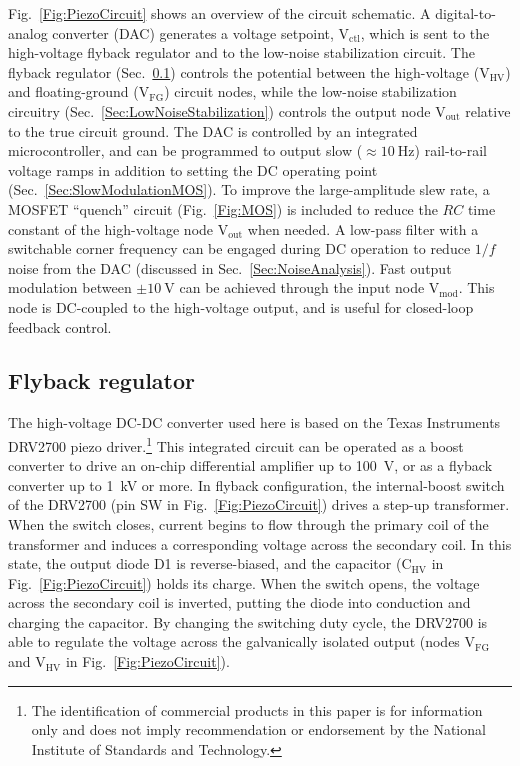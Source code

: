 \documentclass[aip,rsi,reprint]{revtex4-1} %
\begin{document}
Fig.~\ref{Fig:PiezoCircuit} shows an overview of the circuit schematic. 
A digital-to-analog converter (DAC) generates a voltage setpoint, $\text{V}_\text{ctl}$, which is sent to the high-voltage flyback regulator and to the low-noise stabilization circuit.
The flyback regulator (Sec.~\ref{Sec:DRV2700}) controls the potential between the high-voltage ($\text{V}_\text{HV}$) and floating-ground ($\text{V}_\text{FG}$) circuit nodes, while the low-noise stabilization circuitry (Sec.~\ref{Sec:LowNoiseStabilization}) controls the output node $\text{V}_\text{out}$ relative to the true circuit ground.
The DAC is controlled by an integrated microcontroller, and can be programmed to output slow ($\approx\SI{10}{\hertz}$) rail-to-rail voltage ramps in addition to setting the DC operating point (Sec.~\ref{Sec:SlowModulationMOS}).
To improve the large-amplitude slew rate, a MOSFET ``quench'' circuit (Fig.~\ref{Fig:MOS}) is included to reduce the $RC$ time constant of the high-voltage node $\text{V}_\text{out}$ when needed.
A low-pass filter with a switchable corner frequency can be engaged during DC operation to reduce $1/f$ noise from the DAC (discussed in Sec.~\ref{Sec:NoiseAnalysis}).
Fast output modulation between $\pm\SI{10}{\volt}$ can be achieved through the input node $\text{V}_\text{mod}$.
This node is DC-coupled to the high-voltage output, and is useful for closed-loop feedback control.

\subsection{Flyback regulator}
\label{Sec:DRV2700}

The high-voltage DC-DC converter used here is based on the Texas Instruments DRV2700 piezo driver.\footnote{The identification of commercial products in this paper is for information only and does not imply recommendation or endorsement by the National Institute of Standards and Technology.}
This integrated circuit can be operated as a boost converter to drive an on-chip differential amplifier up to \SI{100}{\volt}, or as a flyback converter up to \SI{1}{\kilo\volt} or more.
In flyback configuration, the internal-boost switch of the DRV2700 (pin SW in Fig.~\ref{Fig:PiezoCircuit}) drives a step-up transformer.
When the switch closes, current begins to flow through the primary coil of the transformer and induces a corresponding voltage across the secondary coil.
In this state, the output diode D1 is reverse-biased, and the capacitor ($\text{C}_{\text{HV}}$ in Fig.~\ref{Fig:PiezoCircuit}) holds its charge.
When the switch opens, the voltage across the secondary coil is inverted, putting the diode into conduction and charging the capacitor.
By changing the switching duty cycle, the DRV2700 is able to regulate the voltage across the galvanically isolated output (nodes $\text{V}_\text{FG}$ and $\text{V}_\text{HV}$ in Fig.~\ref{Fig:PiezoCircuit}).
\end{document}
